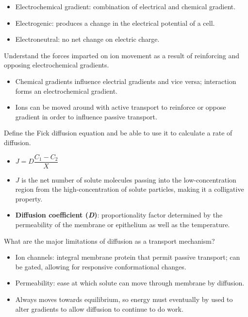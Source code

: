 \documentclass[12pt,a4paper]{article}
\begin{document}
\begin{itemize}
\begin{itemize}
            \item Electrochemical gradient: combination of electrical and chemical gradient.
            \item Electrogenic: produces a change in the electrical potential of a cell.
            \item Electroneutral: no net change on electric charge.
        \end{itemize}
    {\color{G-Moon}\item Understand the forces imparted on ion movement as a result of reinforcing and opposing electrochemical gradients.}
        \begin{itemize}
            \item Chemical gradients influence electrial gradients and vice versa; interaction forms an electrochemical gradient. 
            \item Ions can be moved around with active transport to reinforce or oppose gradient in order to influence passive transport.
        \end{itemize}
    {\color{G-Moon}\item Define the Fick diffusion equation and be able to use it to calculate a rate of diffusion. }
        \begin{itemize}
            \item  \(J=D\dfrac{C_1 - C_2}{X}\)
            \item \(J\) is the net number of solute molecules passing into the low-concentration region from the high-concentration of solute particles, making it a colligative property.
            \item \textbf{Diffusion coefficient (\textit{D})}: proportionality factor determined by the permeability of the membrane or epithelium as well as the temperature.
        \end{itemize}
    {\color{G-Moon}\item What are the major limitations of diffusion as a transport mechanism? }
        \begin{itemize}
            \item Ion channels: integral membrane protein that permit passive transport; can be gated, allowing for responsive conformational changes.
            \item Permeability: ease at which solute can move through membrane by diffusion.
            \item Always moves towards equilibrium, so energy must eventually by used to alter gradients to allow diffusion to continue to do work.

\end{itemize}
\end{itemize}
\end{document}

